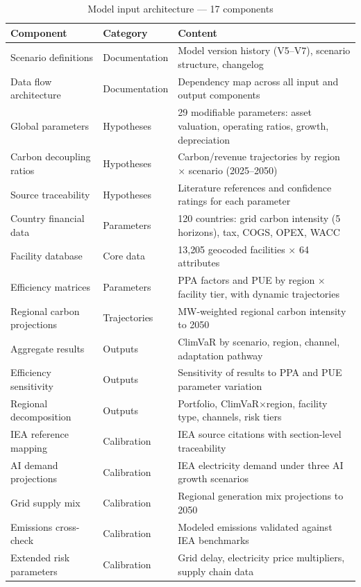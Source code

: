 \begin{table}[H]
\centering
\footnotesize
\caption{Model input architecture --- 17 components}
\label{tab:app_sheets}
\renewcommand{\arraystretch}{1.2}
\begin{tabular}{@{}p{3.8cm}p{2cm}p{7.5cm}@{}}
\toprule
\textbf{Component} & \textbf{Category} & \textbf{Content} \\
\midrule
Scenario definitions & Documentation & Model version history (V5--V7), scenario structure, changelog \\
Data flow architecture & Documentation & Dependency map across all input and output components \\
Global parameters & Hypotheses & 29 modifiable parameters: asset valuation, operating ratios, growth, depreciation \\
Carbon decoupling ratios & Hypotheses & Carbon/revenue trajectories by region $\times$ scenario (2025--2050) \\
Source traceability & Hypotheses & Literature references and confidence ratings for each parameter \\
Country financial data & Parameters & 120 countries: grid carbon intensity (5 horizons), tax, COGS, OPEX, WACC \\
Facility database & Core data & 13{,}205 geocoded facilities $\times$ 64 attributes \\
Efficiency matrices & Parameters & PPA factors and PUE by region $\times$ facility tier, with dynamic trajectories \\
Regional carbon projections & Trajectories & MW-weighted regional carbon intensity to 2050 \\
Aggregate results & Outputs & ClimVaR by scenario, region, channel, adaptation pathway \\
Efficiency sensitivity & Outputs & Sensitivity of results to PPA and PUE parameter variation \\
Regional decomposition & Outputs & Portfolio, ClimVaR$\times$region, facility type, channels, risk tiers \\
IEA reference mapping & Calibration & IEA source citations with section-level traceability \\
AI demand projections & Calibration & IEA electricity demand under three AI growth scenarios \\
Grid supply mix & Calibration & Regional generation mix projections to 2050 \\
Emissions cross-check & Calibration & Modeled emissions validated against IEA benchmarks \\
Extended risk parameters & Calibration & Grid delay, electricity price multipliers, supply chain data \\
\bottomrule
\end{tabular}
\end{table}

